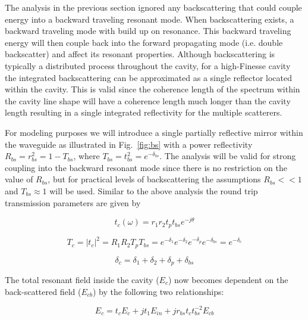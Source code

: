 \documentclass[10pt]{article}
\begin{document}
The analysis in the previous section ignored any backscattering that could couple energy into a backward traveling resonant mode.
When backscattering exists, a backward traveling mode with build up on resonance. 
This backward traveling energy will then couple back into the forward propagating mode (i.e. double backscatter) and affect its resonant properties.
Although backscattering is typically a distributed process throughout the cavity, for a high-Finesse cavity the integrated backscattering can be approximated as a single reflector located within the cavity.
This is valid since the coherence length of the spectrum within the cavity line shape will have a coherence length much longer than the cavity length resulting in a single integrated reflectivity for the multiple scatterers.

For modeling purposes we will introduce a single partially reflective mirror within the waveguide as illustrated in Fig.~\ref{fig:bs} with a power reflectivity $R_{bs}  = r_{bs}^2 = 1-T_{bs}$, where $T_{bs} = t_{bs}^2 = e^{-\delta_{bs}} $.
The analysis will be valid for strong coupling into the backward resonant mode since there is no restriction on the value of $R_{bs}$, but for practical levels of backscattering the assumptions $R_{bs} << 1$ and $T_{bs} \approx 1$ will be used.
Similar to the above analysis the round trip transmission parameters are given by
  
\begin{equation} t_{c}(\omega) = r_1 r_2 t_p t_{bs} e^{-j\theta} \end{equation} 

\begin{equation} 
T_c = |t_c|^2 = R_1 R_2 T_p T_{bs} = e^{-\delta_1} e^{-\delta_2} e^{-\delta_p} e^{-\delta_{bs}} = e^{-\delta_c}  \end{equation}


\begin{equation} 
\delta_c = \delta_1 + \delta_2 + \delta_p + \delta_{bs} \end{equation}  



The total resonant field inside the cavity ($E_c$) now becomes dependent on the back-scattered field ($E_{cb}$) by the following two relationships:

\begin{equation} 
E_c = t_c E_c + jt_1E_{in} + jr_{bs} t_c t_{bs}^{-2} E_{cb} 
\end{equation}  
\end{document}
